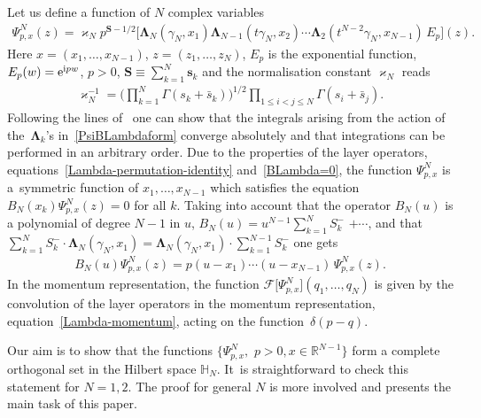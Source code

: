  Let us define a function of $N$ complex variables %
\begin{gather}\label{PsiBLambdaform}
\Psi^N_{p,{x}}(z)=\varkappa_N p^{\boldsymbol S-1/2}
 \big[
 \boldsymbol\Lambda_N\left(\gamma_N, x_1\right)
 \boldsymbol\Lambda_{N-1}\left(t\gamma_N, x_2\right)\cdots \boldsymbol\Lambda_2\left(t^{N-2}\gamma_N, x_{N-1}\right) \, E_p\big](z).
\end{gather}
Here $ x=(x_1,\dots,x_{N-1})$, $z=(z_1,\dots, z_N)$, $E_p$ is the exponential function,
$E_p(w)={\rm e}^{{\rm i}pw}$, $p>0$, $\boldsymbol
S\equiv\sum_{k=1}^N \boldsymbol s_k$ and the normalisation constant $\varkappa_N$ reads
\begin{gather*}
\varkappa_N^{-1}=\Bigg(\prod_{k=1}^N\Gamma(s_k+\bar s_k)\Bigg)^{1/2} \prod_{1\leq i<j\leq N}\Gamma(s_i+\bar s_j).
\end{gather*}
Following the lines of~\cite{Kozlowski:2014jka} one can show that the integrals arising from the action of the~$\boldsymbol\Lambda_k$'s in~\eqref{PsiBLambdaform} converge absolutely and that integrations can be performed in an arbitrary order. Due
to the properties of the layer operators, equations~\eqref{Lambda-permutation-identity} and~\eqref{BLambda=0}, the function $ \Psi^N_{p,{x}}$
is a~sym\-met\-ric function of $x_1,\dots, x_{N-1}$ which satisfies the equation $B_N(x_k)\Psi^N_{p,{x}}({z})=0$ for all $k$. Taking into
account that the operator $B_N(u)$ is a polynomial of degree $N-1$ in $u$, $B_N(u)= u^{N-1} \sum_{k=1}^{N} S^-_k$ $+\cdots$, and that
$\sum_{k=1}^{N} S^-_k \cdot \boldsymbol\Lambda_N(\gamma_N, x_1) = \boldsymbol\Lambda_N(\gamma_N, x_1) \cdot \sum_{k=1}^{N-1} S^-_k$
one gets
\begin{gather*}
B_N(u) \Psi^N_{p,{x}}({z})=p(u-x_1)\cdots (u-x_{N-1})\,\Psi^N_{p,{x}}({z}).
\end{gather*}
In the momentum representation, the function $ \mathcal{F}\big[\Psi^N_{p,{x}}\big](q_1,\dots,q_N)$ is given by the convolution of the
layer operators in the momentum representation, equation~\eqref{Lambda-momentum}, acting on the func\-tion~$\delta(p-q)$.

Our aim is to show that the functions $\big\{\Psi^N_{p,{x}},\,\, p>0, {x}\in \mathbb R^{N-1}\big\}$ form a complete orthogonal set in the
Hilbert space $\mathbb H_N$. It~is straightforward to check this statement for $N=1,2$. The proof for general $N$ is more involved and
presents the main task of this paper.


